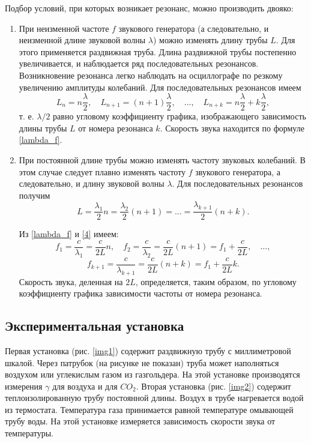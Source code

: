 \documentclass[12pt,a4paper]{article}
\begin{document}
Подбор условий, при которых возникает резонанс, можно производить двояко:
\begin{enumerate}
	\item При неизменной частоте $ f $ звукового генератора (а следовательно, и неизменной длине звуковой волны $ \lambda $) можно изменять длину трубы $ L $. Для этого применяется раздвижная труба. Длина раздвижной трубы постепенно увеличивается, и наблюдается ряд последовательных резонансов. Возникновение резонанса легко наблюдать на осциллографе по резкому увеличению амплитуды колебаний. Для последовательных резонансов имеем \begin{equation}\label{first}
	L_n=n\frac{\lambda}{2}, \quad L_{n+1}=(n+1)\frac{\lambda}{2}, \quad \dots, \quad L_{n+k} = n\frac{\lambda}{2}+k\frac{\lambda}{2},
	\end{equation} т. е. $ \lambda/2 $ равно угловому коэффициенту графика, изображающего зависимость длины трубы $ L $ от номера резонанса $ k $. Скорость звука находится по формуле \eqref{lambda_f}.
	\item При постоянной длине трубы можно изменять частоту звуковых колебаний. В этом случае следует плавно изменять частоту $ f $ звукового генератора, а следовательно, и длину звуковой волны $ \lambda $. Для последовательных резонансов получим 
	\begin{equation}\label{4}
	L=\frac{\lambda_1}{2}n=\frac{\lambda_2}{2}(n+1)=\dots=\frac{\lambda_{k+1}}{2}(n+k).
	\end{equation}
	
	Из \eqref{lambda_f} и \eqref{4} имеем:
	\[ f_1=\frac{c}{\lambda_1}=\frac{c}{2L}n, \quad f_2=\frac{c}{\lambda_2}=\frac{c}{2L}(n+1)=f_1+\frac{c}{2L},\quad \dots, \]
	\begin{equation}\label{5}
	f_{k+1}=\frac{c}{\lambda_{k+1}}=\frac{c}{2L}(n+k)=f_1+\frac{c}{2L}k.
	\end{equation}
	Скорость звука, деленная на $ 2L $, определяется, таким образом, по угловому коэффициенту графика зависимости частоты от номера резонанса.
\end{enumerate}


\subsection{Экспериментальная установка}

Первая установка (рис. \ref{img1}) содержит раздвижную трубу с миллиметровой шкалой. Через патрубок (на рисунке не показан) труба может наполняться воздухом или углекислым газом из газгольдера. На этой установке производятся измерения $ \gamma $ для воздуха и для $ CO_2 $. Вторая установка (рис. \ref{img2}) содержит теплоизолированную трубу постоянной длины. Воздух в трубе нагревается водой из термостата. Температура газа принимается равной температуре омывающей трубу воды. На этой установке измеряется зависимость скорости звука от температуры.
\end{document}
